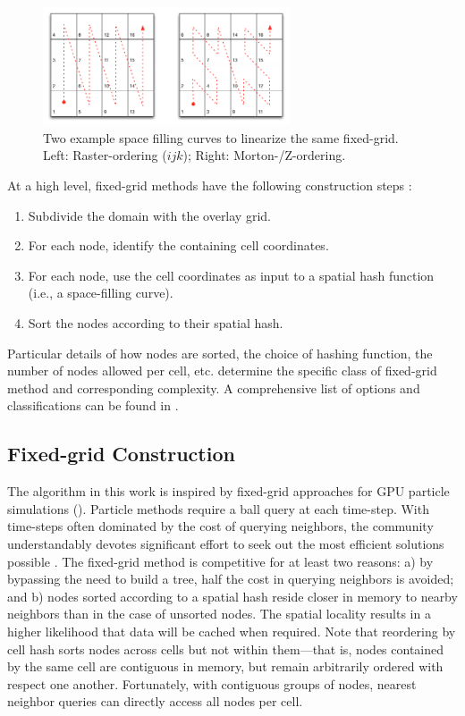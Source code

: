 \documentclass{report}
\begin{document}
\begin{figure}
\centering
\includegraphics[width=0.65\textwidth]{rbffd_methods_content/neighbors/space_filling_curves.png}
\caption{Two example space filling curves to linearize the same fixed-grid. Left: Raster-ordering ($ijk$); Right: Morton-/Z-ordering.}
\label{fig:space_filling_curves}
\end{figure} 


At a high level, fixed-grid methods have the following construction steps \cite{Krog2010}:
\begin{enumerate}
\item Subdivide the domain with the overlay grid.
\item For each node, identify the containing cell coordinates.
\item For each node, use the cell coordinates as input to a spatial hash function (i.e., a space-filling curve).
\item Sort the nodes according to their spatial hash.
\end{enumerate}
Particular details of how nodes are sorted, the choice of hashing function, the number of nodes allowed per cell, etc. determine the specific class of fixed-grid method and corresponding complexity. A comprehensive list of options and classifications can be found in \cite{Samet2005}. 

\subsection{Fixed-grid Construction}
The algorithm in this work is inspired by fixed-grid approaches for GPU particle simulations (\cite{Krog2010,Green2010,Johnson2011}). Particle methods require a ball query at each time-step. With time-steps often dominated by the cost of querying neighbors, the community understandably devotes significant effort to seek out the most efficient solutions possible \cite{Goswami2010}. The fixed-grid method is competitive for at least two reasons: a) by bypassing the need to build a tree, half the cost in querying neighbors is avoided; and b) nodes sorted according to a spatial hash reside closer in memory to nearby neighbors than in the case of unsorted nodes. The spatial locality results in a higher likelihood that data will be cached when required. Note that reordering by cell hash sorts nodes across cells but not within them---that is, nodes contained by the same cell are contiguous in memory, but remain arbitrarily ordered with respect one another. Fortunately, with contiguous groups of nodes, nearest neighbor queries can directly access all nodes per cell. 
\end{document}
